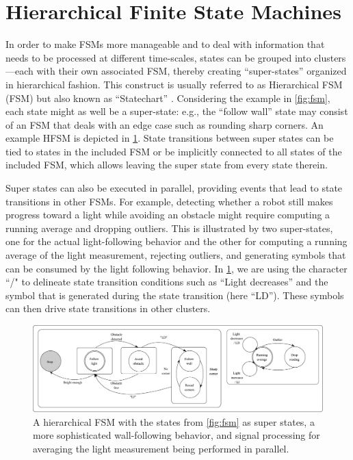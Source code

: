 \section{Hierarchical Finite State Machines}\label{sec:stateflow}

In order to make FSMs more manageable and to deal with information that needs to be processed at different time-scales, states can be grouped into clusters---each with their own associated FSM, thereby creating ``super-states'' organized in hierarchical fashion. This construct is usually referred to as Hierarchical FSM (FSM) but also known as ``Statechart'' \cite{harel1987statecharts}.
Considering the example in \cref{fig:fsm}, each state might as well be a super-state: e.g., the ``follow wall'' state may consist of an FSM that deals with an edge case such as rounding sharp corners. An example HFSM is depicted in \cref{fig:hfsm}. State transitions between super states can be tied to states in the included FSM or be implicitly connected to all states of the included FSM, which allows leaving the super state from every state therein.

Super states can also be executed in parallel, providing events that lead to state transitions in other FSMs. For example, detecting whether a robot still makes progress toward a light while avoiding an obstacle might require computing a running average and dropping outliers. This is illustrated by two super-states, one for the actual light-following behavior and the other for computing a running average of the light measurement, rejecting outliers, and generating symbols that can be consumed by the light following behavior. In \cref{fig:hfsm}, we are using the character ``/" to delineate state transition conditions such as ``Light decreases'' and the symbol that is generated during the state transition (here ``LD''). These symbols can then drive state transitions in other clusters.

\begin{figure}
\centering
    \includegraphics[width=1.0\textwidth]{figs/HFSM.pdf}
\caption{A hierarchical FSM with the states from \cref{fig:fsm} as super states, a more sophisticated wall-following behavior, and signal processing for averaging the light measurement being performed in parallel. \label{fig:hfsm}}
\end{figure}

